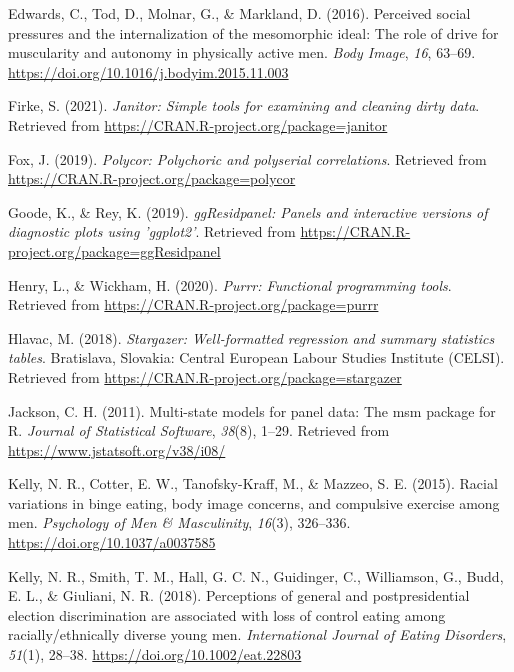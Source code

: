 \documentclass[
  english,
  man, fleqn, noextraspace,floatsintext]{apa6}
\newlength{\cslhangindent}
\newlength{\cslentryspacingunit} %
\newenvironment{CSLReferences}[2] %
 {%
  \setlength{\parindent}{0pt}
  \ifodd #1
  \let\oldpar\par
  \def\par{\hangindent=\cslhangindent\oldpar}
  \fi
  \setlength{\parskip}{#2\cslentryspacingunit}
 }%
 {}
\begin{document}
\begin{CSLReferences}{1}{0}
\leavevmode{}%
Edwards, C., Tod, D., Molnar, G., \& Markland, D. (2016). Perceived social pressures and the internalization of the mesomorphic ideal: {The} role of drive for muscularity and autonomy in physically active men. \emph{Body Image}, \emph{16}, 63--69. \url{https://doi.org/10.1016/j.bodyim.2015.11.003}

\leavevmode{}%
Firke, S. (2021). \emph{Janitor: Simple tools for examining and cleaning dirty data}. Retrieved from \url{https://CRAN.R-project.org/package=janitor}

\leavevmode{}%
Fox, J. (2019). \emph{Polycor: Polychoric and polyserial correlations}. Retrieved from \url{https://CRAN.R-project.org/package=polycor}

\leavevmode{}%
Goode, K., \& Rey, K. (2019). \emph{ggResidpanel: Panels and interactive versions of diagnostic plots using 'ggplot2'}. Retrieved from \url{https://CRAN.R-project.org/package=ggResidpanel}

\leavevmode{}%
Henry, L., \& Wickham, H. (2020). \emph{Purrr: Functional programming tools}. Retrieved from \url{https://CRAN.R-project.org/package=purrr}

\leavevmode{}%
Hlavac, M. (2018). \emph{Stargazer: Well-formatted regression and summary statistics tables}. Bratislava, Slovakia: Central European Labour Studies Institute (CELSI). Retrieved from \url{https://CRAN.R-project.org/package=stargazer}

\leavevmode{}%
Jackson, C. H. (2011). Multi-state models for panel data: The {msm} package for {R}. \emph{Journal of Statistical Software}, \emph{38}(8), 1--29. Retrieved from \url{https://www.jstatsoft.org/v38/i08/}

\leavevmode{}%
Kelly, N. R., Cotter, E. W., Tanofsky-Kraff, M., \& Mazzeo, S. E. (2015). Racial variations in binge eating, body image concerns, and compulsive exercise among men. \emph{Psychology of Men \& Masculinity}, \emph{16}(3), 326--336. \url{https://doi.org/10.1037/a0037585}

\leavevmode{}%
Kelly, N. R., Smith, T. M., Hall, G. C. N., Guidinger, C., Williamson, G., Budd, E. L., \& Giuliani, N. R. (2018). Perceptions of general and postpresidential election discrimination are associated with loss of control eating among racially/ethnically diverse young men. \emph{International Journal of Eating Disorders}, \emph{51}(1), 28--38. \url{https://doi.org/10.1002/eat.22803}


\end{CSLReferences}
\end{document}
